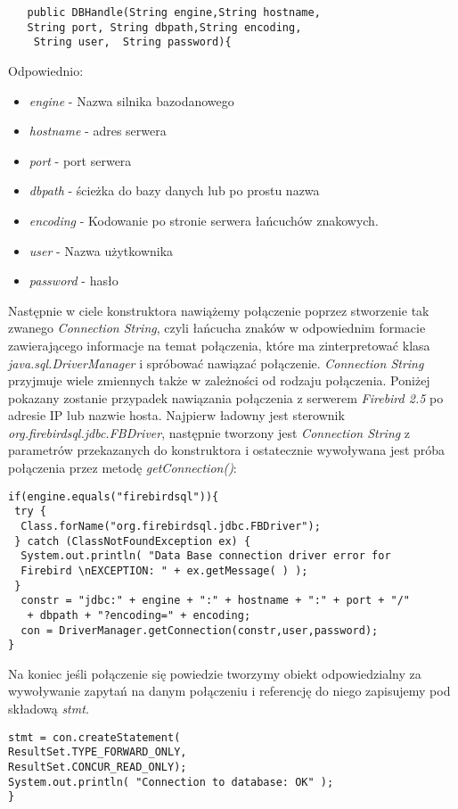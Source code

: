    \begin{lstlisting}
   public DBHandle(String engine,String hostname,
   String port, String dbpath,String encoding,
    String user,  String password){
   \end{lstlisting}
Odpowiednio:
    \begin{itemize}
    \item \emph{engine} - Nazwa silnika bazodanowego
    \item \emph{hostname} - adres serwera
    \item \emph{port} - port serwera
    \item \emph{dbpath} - ścieżka do bazy danych lub po prostu nazwa
    \item \emph{encoding} - Kodowanie po stronie serwera łańcuchów znakowych.
    \item \emph{user} - Nazwa użytkownika
    \item \emph{password} - hasło
    \end{itemize}

Następnie w ciele konstruktora nawiążemy połączenie poprzez stworzenie tak zwanego \emph{Connection String}, czyli łańcucha znaków w odpowiednim formacie zawierającego informacje na temat połączenia, które ma zinterpretować klasa \emph{java.sql.DriverManager} i spróbować nawiązać połączenie. \emph{Connection String} przyjmuje wiele zmiennych także w zależności od rodzaju połączenia. Poniżej pokazany zostanie przypadek nawiązania połączenia z serwerem \emph{Firebird 2.5} po adresie IP lub nazwie hosta. Najpierw ładowny jest sterownik \emph{org.firebirdsql.jdbc.FBDriver}, następnie tworzony jest \emph{Connection String} z parametrów przekazanych do konstruktora i ostatecznie wywoływana jest próba połączenia przez metodę \emph{getConnection()}:
   \begin{lstlisting}
if(engine.equals("firebirdsql")){
 try {
  Class.forName("org.firebirdsql.jdbc.FBDriver");
 } catch (ClassNotFoundException ex) {
  System.out.println( "Data Base connection driver error for 
  Firebird \nEXCEPTION: " + ex.getMessage( ) );
 }
  constr = "jdbc:" + engine + ":" + hostname + ":" + port + "/"
   + dbpath + "?encoding=" + encoding;
  con = DriverManager.getConnection(constr,user,password);
}
\end{lstlisting}

Na koniec jeśli połączenie się powiedzie tworzymy obiekt odpowiedzialny za wywoływanie zapytań na danym połączeniu i referencję do niego zapisujemy pod składową \emph{stmt}.
\begin{lstlisting}
stmt = con.createStatement(
ResultSet.TYPE_FORWARD_ONLY,
ResultSet.CONCUR_READ_ONLY);
System.out.println( "Connection to database: OK" );
}
\end{lstlisting}

